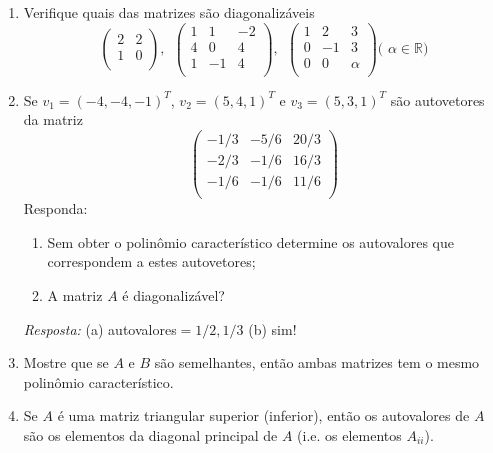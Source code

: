 \documentclass[10pt]{article}
\theoremstyle{plain}
\theoremstyle{obs}
\numberwithin{equation}{section}
\begin{document}
\begin{enumerate}
   \item Verifique quais das matrizes são diagonalizáveis
$$
\begin{pmatrix}
2 & 2 \\
1 & 0 \\
\end{pmatrix}, \ \ 
\begin{pmatrix}
1 & 1 & -2 \\
4 & 0 & 4 \\
1 & -1 & 4 \\
\end{pmatrix}, \ \
\begin{pmatrix}
1 & 2 & 3 \\%
0 & -1 & 3 \\
0 & 0 & \alpha \\
\end{pmatrix} \text{( $\alpha \in \mathbb{R}$)}
$$   
 \item Se $v_1=(-4,-4,-1)^{T}$, 
 $v_2=(5,4,1)^{T}$ e $v_{3}=(5,3,1)^{T}$
 são autovetores da matriz
 $$
 \begin{pmatrix}
-1/3 & -5/6 & 20/3 \\%
-2/3 & -1/6 & 16/3 \\
-1/6 & -1/6 & 11/6 \\
\end{pmatrix}
 $$
 Responda: 
 \begin{enumerate}
  \item Sem obter o polinômio característico determine os autovalores
  que correspondem a estes autovetores;
  \item A matriz $A$ é diagonalizável? 
 \end{enumerate}
 {\it Resposta: } (a) autovalores$=1/2, 1/3$ (b) sim!

 \item Mostre que se $A$ e $B$ são semelhantes, então ambas matrizes tem o mesmo 
 polinômio característico.
 
 \item Se $A$ é uma matriz triangular superior (inferior), então os autovalores de $A$
 são os elementos da diagonal principal de $A$ (i.e. os elementos $A_{ii}$).
 

\end{enumerate}
\end{document}
